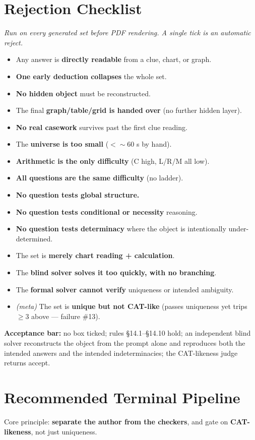 \documentclass[11pt,a4paper]{article}
\newcommand{\xmark}{\ding{55}}
\newcommand{\rejectitem}[1]{\item[\textcolor{catred}{\xmark}] #1}
\begin{document}
\section{Rejection Checklist}
\begin{center}\itshape Run on every generated set before PDF rendering. A single tick is an automatic reject.\end{center}
\begin{itemize}[leftmargin=2.2em,label={}]
\rejectitem{Any answer is \textbf{directly readable} from a clue, chart, or graph.}
\rejectitem{\textbf{One early deduction collapses} the whole set.}
\rejectitem{\textbf{No hidden object} must be reconstructed.}
\rejectitem{The final \textbf{graph/table/grid is handed over} (no further hidden layer).}
\rejectitem{\textbf{No real casework} survives past the first clue reading.}
\rejectitem{The \textbf{universe is too small} ($<\sim$60 s by hand).}
\rejectitem{\textbf{Arithmetic is the only difficulty} (C high, L/R/M all low).}
\rejectitem{\textbf{All questions are the same difficulty} (no ladder).}
\rejectitem{\textbf{No question tests global structure.}}
\rejectitem{\textbf{No question tests conditional or necessity} reasoning.}
\rejectitem{\textbf{No question tests determinacy} where the object is intentionally under-determined.}
\rejectitem{The set is \textbf{merely chart reading + calculation}.}
\rejectitem{The \textbf{blind solver solves it too quickly, with no branching}.}
\rejectitem{The \textbf{formal solver cannot verify} uniqueness or intended ambiguity.}
\rejectitem{\emph{(meta)} The set is \textbf{unique but not CAT-like} (passes uniqueness yet trips $\ge3$ above --- failure \#13).}
\end{itemize}

\textbf{Acceptance bar:} no box ticked; rules \S14.1--\S14.10 hold; an independent blind solver reconstructs the object from the prompt alone and reproduces both the intended answers and the intended indeterminacies; the CAT-likeness judge returns accept.

\section{Recommended Terminal Pipeline}

Core principle: \textbf{separate the author from the checkers}, and gate on \textbf{CAT-likeness}, not just uniqueness.
\end{document}

